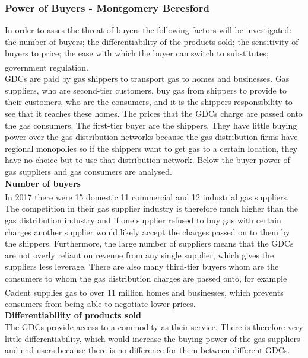 \documentclass[11pt]{article}		%
\newcommand{\supercite}[1]{\textsuperscript{\cite{#1}}}		%
\begin{document}
		\subsubsection[Power of Buyers]{Power of Buyers - Montgomery Beresford}
		        In order to asses the threat of buyers the following factors will be investigated: the number of buyers; the differentiability of the products sold; the sensitivity of buyers to price; the ease with which the buyer can switch to substitutes; government regulation.\supercite{Barney}
		        \\
                GDCs are paid by gas shippers to transport gas to homes and businesses. Gas suppliers, who are second-tier customers, buy gas from shippers to provide to their customers, who are the consumers, and it is the shippers responsibility to see that it reaches these homes. The prices that the GDCs charge are passed onto the gas consumers. The first-tier buyer are the shippers. They have little buying power over the gas distribution networks because the gas distribution firms have regional monopolies so if the shippers want to get gas to a certain location, they have no choice but to use that distribution network. Below the buyer power of gas suppliers and gas consumers are analysed.
                \\
                \textbf{Number of buyers}
                \\
                In 2017 there were 15 domestic  11 commercial and 12 industrial  gas suppliers.\supercite{competition_in_gas_supply} The competition in their gas supplier industry is therefore much higher than the gas distribution industry and if one supplier refused to buy gas with certain charges another supplier would likely accept the charges passed on to them by the shippers. Furthermore, the large number of suppliers means that the GDCs are not overly reliant on revenue from any single supplier, which gives the suppliers less leverage. There are also many third-tier buyers whom are the consumers to whom the gas distribution charges are passed onto, for example Cadent supplies gas to over 11 million homes and businesses\supercite{Cadent_Plan}, which prevents consumers from being able to negotiate lower prices.
                \\
                \textbf{Differentiability of products sold}
                \\
                The GDCs provide access to a commodity as their service. There is therefore very little differentiability, which would increase the buying power of the gas suppliers and end users because there is no difference for them between different GDCs.
\end{document}
